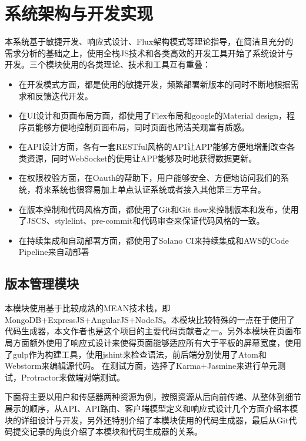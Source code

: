 
\chapter{系统架构与开发实现}
\label{chap:design_and_implement}
本系统基于敏捷开发、响应式设计、Flux架构模式等理论指导，在简洁且充分的需求分析的基础之上，使用全栈JS技术和各类高效的开发工具开始了系统设计与开发。三个模块使用的各类理论、技术和工具互有重叠：
\begin{itemize}
  \item 在开发模式方面，都是使用的敏捷开发，频繁部署新版本的同时不断地根据需求和反馈迭代开发。
  \item 在UI设计和页面布局方面，都使用了Flex布局和google的Material design，程序员能够方便地控制页面布局，同时页面也简洁美观富有质感。
  \item 在API设计方面，各有一套RESTful风格的API让APP能够方便地增删改查各类资源，同时WebSocket的使用让APP能够及时地获得数据更新。
  \item 在权限校验方面，在Oauth的帮助下，用户能够安全、方便地访问我们的系统，将来系统也很容易加上单点认证系统或者接入其他第三方平台。
  \item 在版本控制和代码风格方面，都使用了Git和Git flow来控制版本和发布，使用了JSCS、stylelint、pre-commit和代码审查来保证代码风格的一致。
  \item 在持续集成和自动部署方面，都使用了Solano CI来持续集成和AWS的Code Pipeline来自动部署
\end{itemize}
\section{版本管理模块}
本模块使用基于比较成熟的MEAN技术栈，即MongoDB+ExpressJS+AngularJS+NodeJS。本模块比较特殊的一点在于使用了代码生成器，本文作者也是这个项目的主要代码贡献者之一。另外本模块在页面布局方面额外使用了响应式设计来使得页面能够适应所有大于平板的屏幕宽度，使用了gulp作为构建工具，使用jshint来检查语法，前后端分别使用了Atom和Webstorm来编辑源代码。 在测试方面，选择了Karma+Jasmine来进行单元测试，Protractor来做端对端测试。

下面将主要以用户和传感器两种资源为例，按照资源从后向前传递、从整体到细节展示的顺序，从API、API路由、客户端模型定义和响应式设计几个方面介绍本模块的详细设计与开发，另外还特别介绍了本模块使用的代码生成器，最后从Git代码提交记录的角度介绍了本模块和代码生成器的关系。
